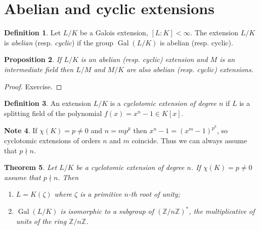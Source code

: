 \documentclass[12pt, letterpaper, oneside]{article}
\theoremstyle{plain}
\newtheorem{theorem}{Theorem}[section]
\newtheorem{proposition}[theorem]{Proposition}
\theoremstyle{definition}
\newtheorem{definition}[theorem]{Definition}
\newtheorem{note}[theorem]{Note}
\newcommand{\Z}{{\mathbb Z}}
\newcommand{\Gal}{\operatorname{Gal}}
\newcommand{\benu}{\begin{enumerate}}
\newcommand{\eenu}{\end{enumerate}}
\newcommand{\vs}{\vskip 5mm}
\begin{document}


\newpage
\section{Abelian and cyclic extensions}
\label{SEC_ABANDCYCEXT}

\begin{definition}
Let $L/K$ be a Galois extension, $[L:K] < \infty$. The extension $L/K$ is 
\emph{abelian} (resp. \emph{cyclic}) if the group $\Gal(L/K)$ is abelian 
(resp. cyclic). 
\end{definition}

\vs\vs


\begin{proposition}
If $L/K$ is an abelian (resp. cyclic) extension and $M$ is an intermediate field 
then $L/M$ and $M/K$ are also abelian (resp. cyclic) extensions. 
\end{proposition}


\vs

\begin{proof}
Exercise. 
\end{proof}


\vs\vs

\begin{definition}
\label{DEF_CYCLOTEXT}
An extension $L/K$ is a \emph{cyclotomic extension of degree $n$}  if $L$ is a splitting 
field of the polynomial $f(x) = x^{n} -1 \in K[x]$. 
\end{definition}


\vs\vs


\begin{note}
If $\chi(K)=p\neq 0$ and $n=mp^{k}$ then $x^{n}-1 = (x^{m} -1)^{p^{k}}$, so 
cyclotomic extensions of orders $n$ and $m$ coincide. Thus we can always assume 
that $p\nmid n$. 
\end{note}


\vs\vs



\begin{theorem}
\label{THM_CYCLOTEXT}
Let $L/K$ be a cyclotomic extension of degree $n$. If $\chi(K) = p\neq 0$ assume that 
$p\nmid n$. Then 

\vskip -13mm

\benu
\item $L = K(\zeta)$ where $\zeta$ is a primitive $n$-th root of unity;
\item $\Gal(L/K)$ is isomorphic to a subgroup of $(\Z/n\Z)^{\ast}$, the multiplicative 
of units of the ring $\Z/n\Z$.
\eenu

\end{theorem}
\end{document}
